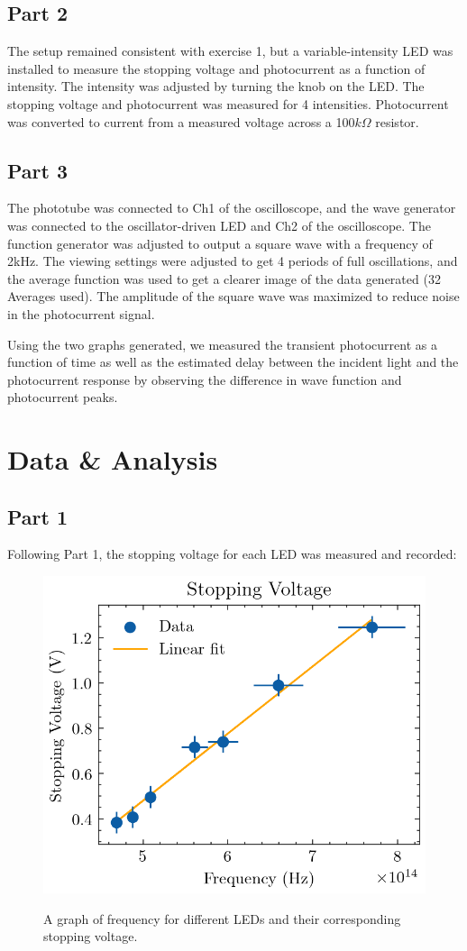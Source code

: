 \documentclass[12pt,twocolumn]{article}
\begin{document}
\subsection*{Part 2}
The setup remained consistent with exercise 1, but a variable-intensity LED was installed to measure the stopping voltage and photocurrent as a function of intensity.
The intensity was adjusted by turning the knob on the LED. The stopping voltage and photocurrent was measured for 4 intensities.
Photocurrent was converted to current from a measured voltage across a 100$k\Omega$ resistor.

\subsection*{Part 3}
The phototube was connected to Ch1 of the oscilloscope, and the wave generator was connected to the oscillator-driven LED and Ch2 of the oscilloscope. 
The function generator was adjusted to output a square wave with a frequency of 2kHz. 
The viewing settings were adjusted to get 4 periods of full oscillations, and the average function was used to get a clearer image of the data generated (32 Averages used).
The amplitude of the square wave was maximized to reduce noise in the photocurrent signal.

Using the two graphs generated, we measured the transient photocurrent as a function of time as well as the estimated delay between the incident light and the photocurrent response by observing the difference in wave function and photocurrent peaks.

\section{Data \& Analysis}
\subsection*{Part 1}
Following Part 1, the stopping voltage for each LED was measured and recorded:

\begin{figure}[H]
\begin{centering}
\includegraphics[width=0.5 \textwidth]{img/part1a.png}
\label{fig:p1}
\caption{A graph of frequency for different LEDs and their corresponding stopping voltage.}
\end{centering}
\end{figure}
\end{document}
